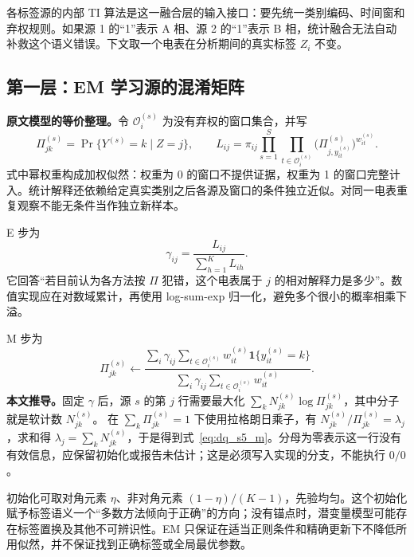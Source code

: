 各标签源的内部 TI 算法是这一融合层的输入接口：要先统一类别编码、时间窗和弃权规则。如果源 1 的“1”表示 A 相、源 2 的“1”表示 B 相，统计融合无法自动补救这个语义错误。下文取一个电表在分析期间的真实标签 $Z_i$ 不变。

\subsection{第一层：EM 学习源的混淆矩阵}

\textbf{原文模型的等价整理。}令 $\mathcal O_i^{(s)}$ 为没有弃权的窗口集合，并写
\begin{equation}
 \Pi_{jk}^{(s)}=\Pr\{Y^{(s)}=k\mid Z=j\},\qquad
 L_{ij}=\pi_{ij}\prod_{s=1}^S\prod_{t\in\mathcal O_i^{(s)}}
       \bigl(\Pi_{j,y_{it}^{(s)}}^{(s)}\bigr)^{w_{it}^{(s)}}.
 \label{eq:dq_s5_likelihood}
\end{equation}
式中幂权重构成加权似然：权重为 0 的窗口不提供证据，权重为 1 的窗口完整计入。统计解释还依赖给定真实类别之后各源及窗口的条件独立近似。对同一电表重复观察不能无条件当作独立新样本。

E 步为
\begin{equation}
 \gamma_{ij}=\frac{L_{ij}}{\sum_{h=1}^K L_{ih}}.
 \label{eq:dq_s5_e}
\end{equation}
它回答“若目前认为各方法按 $\Pi$ 犯错，这个电表属于 $j$ 的相对解释力是多少”。数值实现应在对数域累计，再使用 log-sum-exp 归一化，避免多个很小的概率相乘下溢。

M 步为
\begin{equation}
 \Pi_{jk}^{(s)}\leftarrow
 \frac{\displaystyle\sum_i\gamma_{ij}
       \sum_{t\in\mathcal O_i^{(s)}}w_{it}^{(s)}\mathbf1\{y_{it}^{(s)}=k\}}
      {\displaystyle\sum_i\gamma_{ij}
       \sum_{t\in\mathcal O_i^{(s)}}w_{it}^{(s)}}.
 \label{eq:dq_s5_m}
\end{equation}
\textbf{本文推导。}固定 $\gamma$ 后，源 $s$ 的第 $j$ 行需要最大化
$\sum_k N_{jk}^{(s)}\log\Pi_{jk}^{(s)}$，其中分子就是软计数 $N_{jk}^{(s)}$。
在 $\sum_k\Pi_{jk}^{(s)}=1$ 下使用拉格朗日乘子，有
$N_{jk}^{(s)}/\Pi_{jk}^{(s)}=\lambda_j$，求和得 $\lambda_j=\sum_kN_{jk}^{(s)}$，于是得到式~\eqref{eq:dq_s5_m}。分母为零表示这一行没有有效信息，应保留初始化或报告未估计；这是必须写入实现的分支，不能执行 $0/0$。

初始化可取对角元素 $\eta$、非对角元素 $(1-\eta)/(K-1)$，先验均匀。这个初始化赋予标签语义一个“多数方法倾向于正确”的方向；没有锚点时，潜变量模型可能存在标签置换及其他不可辨识性。EM 只保证在适当正则条件和精确更新下不降低所用似然，并不保证找到正确标签或全局最优参数。

